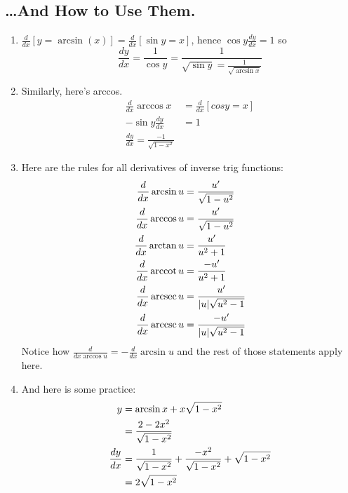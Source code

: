 \documentclass[11pt]{article}
\DeclareMathOperator{\arcsec}{arcsec}
\DeclareMathOperator{\arccot}{arccot}
\DeclareMathOperator{\arccsc}{arccsc}
\begin{document}
\subsection{\dots And How to Use Them.}
\begin{enumerate}
	\item $\frac{d}{dx}[y = \arcsin(x)] = \frac{d}{dx}[\sin y = x]$, hence 
		$\cos y \frac{dy}{dx} = 1$ so 
		$$\frac{dy}{dx} = \frac{1}{\cos y} = \frac{1}{\sqrt{\sin y} =
		\frac{1}{\sqrt{\arcsin x}}}$$
	\item Similarly, here's arccos.
		\begin{align}
			\frac{d}{dx}\arccos x &= \frac{d}{dx}\left[cos y = x\right] \\
			-\sin y \frac{dy}{dx} &= 1 \\
			\frac{dy}{dx} = \frac{-1}{\sqrt{1-x^2}}
		\end{align}
	\item Here are the rules for all derivatives of inverse trig functions:
		\begin{align}
			\setcounter{equation}{0}
			\frac{d}{dx}\arcsin u &= \frac{u^\prime}{\sqrt{1-u^2}} \\
			\frac{d}{dx}\arccos u &= \frac{u^\prime}{\sqrt{1-u^2}} \\
			\frac{d}{dx}\arctan u &= \frac{u^\prime}{u^2+1} \\
			\frac{d}{dx}\arccot u &= \frac{-u^\prime}{u^2+1} \\
			\frac{d}{dx}\arcsec u &= \frac{u^\prime}{|u|\sqrt{u^2-1}} \\
			\frac{d}{dx}\arccsc u &= \frac{-u^\prime}{|u|\sqrt{u^2-1}}
		\end{align}
		Notice how $\frac{d}{dx \arccos u} = - \frac{d}{dx} \arcsin u$ and the 
		rest of those statements apply here.
	\item And here is some practice:
		\begin{align}
			\setcounter{equation}{0}
			y &= \arcsin x + x \sqrt{1-x^2} \\
			&= \frac{2-2x^2}{\sqrt{1-x^2}} \\
			\frac{dy}{dx} &= \frac{1}{\sqrt{1-x^2}} + \frac{-x^2}{\sqrt{1-x^2}}
			+ \sqrt{1-x^2} \\
			&= 2\sqrt{1-x^2}
		\end{align}
	\end{enumerate}
\end{document}
